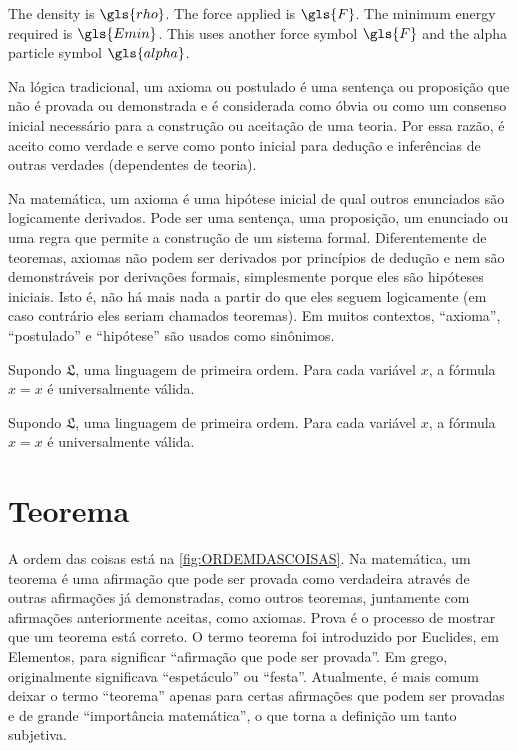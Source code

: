 The density is $\gls{rho}$.
The force applied is $\gls{F}$.
The minimum energy required is $\gls{Emin}$.
This uses another force symbol $\gls{F}$
and the alpha particle symbol $\gls{alpha}$.

Na lógica tradicional, um axioma ou postulado é uma sentença ou proposição que
não é provada ou demonstrada e é considerada como óbvia ou como um consenso
inicial necessário para a construção ou aceitação de uma teoria. Por essa
razão, é aceito como verdade e serve como ponto inicial para dedução e
inferências de outras verdades (dependentes de teoria). 

Na matemática, um axioma é uma hipótese inicial de qual outros enunciados são
logicamente derivados. Pode ser uma sentença, uma proposição, um enunciado ou
uma regra que permite a construção de um sistema formal. Diferentemente de
teoremas, axiomas não podem ser derivados por princípios de dedução e nem são
demonstráveis por derivações formais, simplesmente porque eles são hipóteses
iniciais. Isto é, não há mais nada a partir do que eles seguem logicamente (em
caso contrário eles seriam chamados teoremas). Em muitos contextos,
\enquote{axioma}, \enquote{postulado} e \enquote{hipótese} são usados como
sinônimos. 

\begin{UFSCaxioma}
Supondo $\mathfrak{L}$, uma linguagem de primeira ordem. Para cada variável
$x$, a fórmula $x = x$ é universalmente válida. 
\end{UFSCaxioma}

\begin{UFSCpostulado}
Supondo $\mathfrak{L}$, uma linguagem de primeira ordem. Para cada variável
$x$, a fórmula $x = x$ é universalmente válida. 
\end{UFSCpostulado}

\section{Teorema}


A ordem das coisas está na \autoref{fig:ORDEMDASCOISAS}.  Na matemática, um
teorema é uma afirmação que pode ser provada como verdadeira através de outras
afirmações já demonstradas, como outros teoremas, juntamente com afirmações
anteriormente aceitas, como axiomas. Prova é o processo de mostrar que um
teorema está correto. O termo teorema foi introduzido por Euclides, em
Elementos, para significar \enquote{afirmação que pode ser provada}. Em grego,
originalmente significava \enquote{espetáculo} ou \enquote{festa}.  Atualmente,
é mais comum deixar o termo \enquote{teorema} apenas para certas afirmações que
podem ser provadas e de grande \enquote{importância matemática}, o que torna a
definição um tanto subjetiva.

